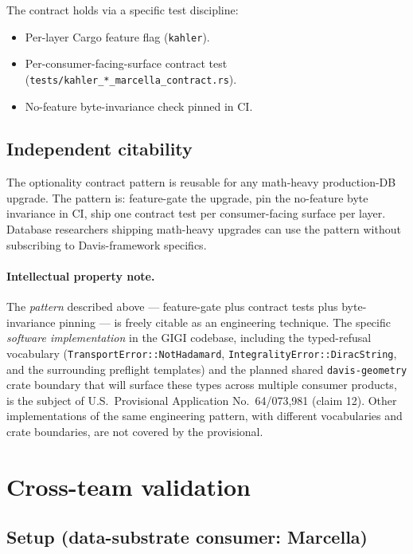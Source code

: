 \documentclass[11pt,letterpaper]{article}
\begin{document}
The contract holds via a specific test discipline:

\begin{itemize}[nosep]
\item Per-layer Cargo feature flag (\texttt{kahler}).
\item Per-consumer-facing-surface contract test
  (\texttt{tests/kahler\_*\_marcella\_contract.rs}).
\item No-feature byte-invariance check pinned in CI.
\end{itemize}

\subsection{Independent citability}

The optionality contract pattern is reusable for any math-heavy
production-DB upgrade. The pattern is: feature-gate the upgrade, pin
the no-feature byte invariance in CI, ship one contract test per
consumer-facing surface per layer. Database researchers shipping
math-heavy upgrades can use the pattern without subscribing to
Davis-framework specifics.

\paragraph{Intellectual property note.}
The \emph{pattern} described above --- feature-gate plus contract
tests plus byte-invariance pinning --- is freely citable as an
engineering technique. The specific \emph{software implementation}
in the GIGI codebase, including the typed-refusal vocabulary
(\texttt{TransportError::NotHadamard},
\texttt{IntegralityError::DiracString}, and the surrounding
preflight templates) and the planned shared
\texttt{davis-geometry} crate boundary that will surface these
types across multiple consumer products, is the subject of
U.S.\ Provisional Application No.\ 64/073,981 (claim 12). Other
implementations of the same engineering pattern, with different
vocabularies and crate boundaries, are not covered by the
provisional.


\section{Cross-team validation}
\label{sec:validation}

\subsection{Setup (data-substrate consumer: Marcella)}
\end{document}
